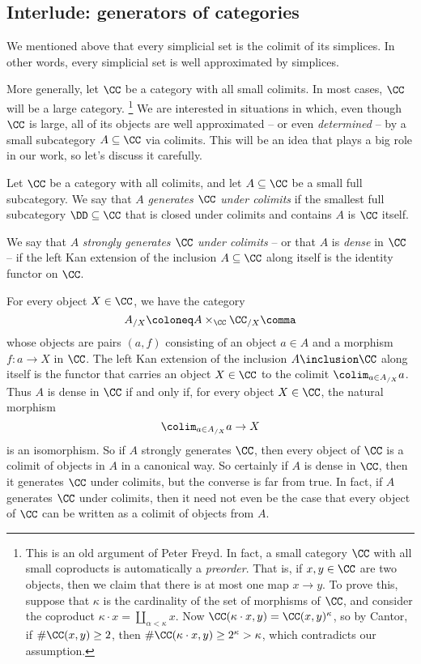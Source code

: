 
\subsection{Interlude: generators of categories \inc}%
\label{sub:generatorsrelations}
We mentioned above that every simplicial set is the colimit of its simplices.
In other words, every simplicial set is well approximated by simplices.

More generally, let $\CC$ be a category with all small colimits.
In most cases, $\CC$ will be a large category.%
\footnote{
  This is an old argument of Peter Freyd.
  In fact, a small category $\CC$ with all small coproducts is automatically a \emph{preorder}.
  That is, if $x,y \in \CC$ are two objects, then we claim that there is at most one map $x \to y$.
  To prove this, suppose that $\kappa$ is the cardinality of the set of morphisms of $\CC$, and consider the coproduct $\kappa \cdot x = \coprod_{\alpha < \kappa} x$.
  Now $\CC(\kappa \cdot x, y) = \CC(x,y)^{\kappa}$, so by Cantor, if $\#\CC(x,y) \geq 2$, then $\#\CC(\kappa\cdot x, y) \geq 2^\kappa > \kappa$, which contradicts our assumption.
}
We are interested in situations in which, even though $\CC$ is large, all of its objects are well approximated -- or even \emph{determined} -- by a small subcategory $A \subseteq \CC$ via colimits.
This will be an idea that plays a big role in our work, so let's discuss it carefully.

\begin{definition}
  Let $\CC$ be a category with all colimits, and let $A \subseteq \CC$ be a small full subcategory.
  We say that $A$ \emph{generates $\CC$ under colimits} if the smallest full subcategory $\DD \subseteq \CC$ that is closed under colimits and contains $A$ is $\CC$ itself.

  We say that $A$ \emph{strongly generates $\CC$ under colimits} -- or that $A$ is \emph{dense} in $\CC$ -- if the left Kan extension of the inclusion $A \subseteq \CC$ along itself is the identity functor on $\CC$.
\end{definition}

For every object $X \in \CC$, we have the category
\[
  A_{/X} \coloneq A \times_{\CC} \CC_{/X} \comma
\]
whose objects are pairs $(a,f)$ consisting of an object $a \in A$ and a morphism $f \colon a \to X$ in $\CC$.
The left Kan extension of the inclusion $A \inclusion \CC$ along itself is the functor that carries an object $X \in \CC$ to the colimit $\colim_{a \in A_{/X}} a$.
Thus $A$ is dense in $\CC$ if and only if, for every object $X \in \CC$, the natural morphism
\[
  \colim_{a \in A_{/X}} a \to X
\]
is an isomorphism.
So if $A$ strongly generates $\CC$, then every object of $\CC$ is a colimit of objects in $A$ in a canonical way.
So certainly if $A$ is dense in $\CC$, then it generates $\CC$ under colimits, but the converse is far from true.
In fact, if $A$ generates $\CC$ under colimits, then it need not even be the case that every object of $\CC$ can be written as a colimit of objects from $A$.

